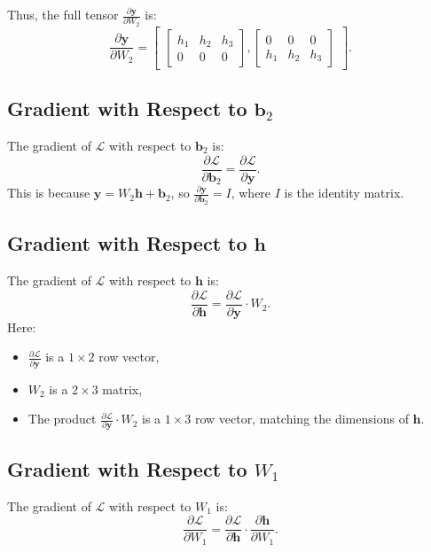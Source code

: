 \begin{notechapter}
Thus, the full tensor \( \frac{\partial \mathbf{y}}{\partial W_2} \) is:
\[
\frac{\partial \mathbf{y}}{\partial W_2} = \begin{bmatrix}
\begin{bmatrix}
h_1 & h_2 & h_3 \\
0 & 0 & 0
\end{bmatrix},
\begin{bmatrix}
0 & 0 & 0 \\
h_1 & h_2 & h_3
\end{bmatrix}
\end{bmatrix}.
\]

\subsection{Gradient with Respect to \( \mathbf{b}_2 \)}

The gradient of \( \mathcal{L} \) with respect to \( \mathbf{b}_2 \) is:
\[
\frac{\partial \mathcal{L}}{\partial \mathbf{b}_2} = \frac{\partial \mathcal{L}}{\partial \mathbf{y}}.
\]
This is because \( \mathbf{y} = W_2 \mathbf{h} + \mathbf{b}_2 \), so \( \frac{\partial \mathbf{y}}{\partial \mathbf{b}_2} = I \), 
where \( I \) is the identity matrix.

\subsection{Gradient with Respect to \( \mathbf{h} \)}

The gradient of \( \mathcal{L} \) with respect to \( \mathbf{h} \) is:
\[
\frac{\partial \mathcal{L}}{\partial \mathbf{h}} = \frac{\partial \mathcal{L}}{\partial \mathbf{y}} \cdot W_2.
\]
Here:
\begin{itemize}
    \item \( \frac{\partial \mathcal{L}}{\partial \mathbf{y}} \) is a \( 1 \times 2 \) row vector,
    \item \( W_2 \) is a \( 2 \times 3 \) matrix,
    \item The product \( \frac{\partial \mathcal{L}}{\partial \mathbf{y}} \cdot W_2 \) is a \( 1 \times 3 \) 
          row vector, matching the dimensions of \( \mathbf{h} \).
\end{itemize}

\subsection{Gradient with Respect to \( W_1 \)}

The gradient of \( \mathcal{L} \) with respect to \( W_1 \) is:
\[
\frac{\partial \mathcal{L}}{\partial W_1} = \frac{\partial \mathcal{L}}{\partial \mathbf{h}} 
\cdot \frac{\partial \mathbf{h}}{\partial W_1}.
\]


\end{notechapter}
